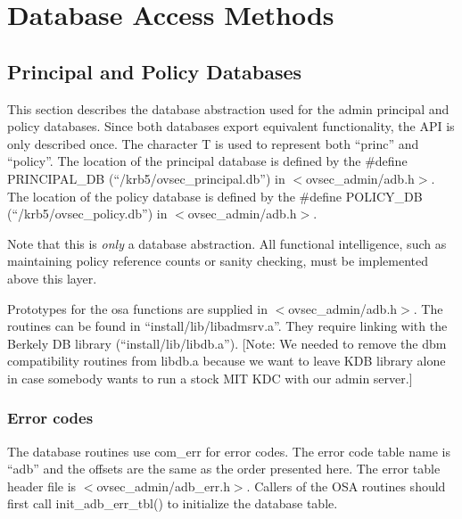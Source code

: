 \section{Database Access Methods}

\subsection{Principal and Policy Databases}

This section describes the database abstraction used for the admin
principal and policy databases.  Since both databases export
equivalent functionality, the API is only described once.  The
character T is used to represent both ``princ'' and ``policy''. The
location of the principal database is defined by the \#define
PRINCIPAL_DB (``/krb5/ovsec_principal.db'') in $<$ovsec_admin/adb.h$>$. The
location of the policy database is defined by the \#define POLICY_DB
(``/krb5/ovsec_policy.db'') in $<$ovsec_admin/adb.h$>$.

Note that this is {\it only} a database abstraction.  All functional
intelligence, such as maintaining policy reference counts or sanity
checking, must be implemented above this layer.

Prototypes for the osa functions are supplied in
$<$ovsec_admin/adb.h$>$. The routines can be found in
``install/lib/libadmsrv.a''. They require linking with the Berkely DB
library (``install/lib/libdb.a''). [Note: We needed to remove the dbm
compatibility routines from libdb.a because we want to leave KDB
library alone in case somebody wants to run a stock MIT KDC with our
admin server.]

\subsubsection{Error codes}

The database routines use com_err for error codes.  The error code
table name is ``adb'' and the offsets are the same as the order
presented here. The error table header file is
$<$ovsec_admin/adb_err.h$>$. Callers of the OSA routines should first call
init_adb_err_tbl() to initialize the database table.

